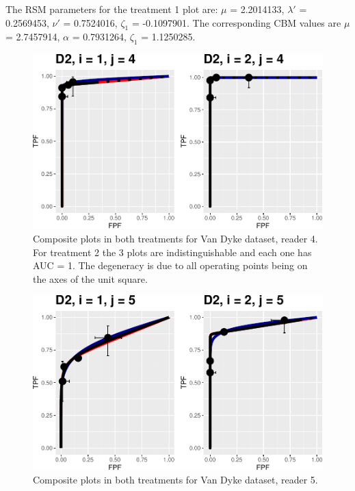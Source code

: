 \documentclass[
]{book}
\begin{document}
The RSM parameters for the treatment 1 plot are: \(\mu\) = 2.2014133, \(\lambda'\) = 0.2569453, \(\nu'\) = 0.7524016, \(\zeta_1\) = -0.1097901. The corresponding CBM values are \(\mu\) = 2.7457914, \(\alpha\) = 0.7931264, \(\zeta_1\) = 1.1250285.

\begin{figure}
\centering
\includegraphics{10-rsm-3-fits_files/figure-latex/rsm-3-fits-plots-1-4-1.pdf}
\caption{\label{fig:rsm-3-fits-plots-1-4}Composite plots in both treatments for Van Dyke dataset, reader 4. For treatment 2 the 3 plots are indistinguishable and each one has AUC = 1. The degeneracy is due to all operating points being on the axes of the unit square.}
\end{figure}

\begin{figure}
\centering
\includegraphics{10-rsm-3-fits_files/figure-latex/rsm-3-fits-plots-1-5-1.pdf}
\caption{\label{fig:rsm-3-fits-plots-1-5}Composite plots in both treatments for Van Dyke dataset, reader 5.}
\end{figure}
\end{document}
